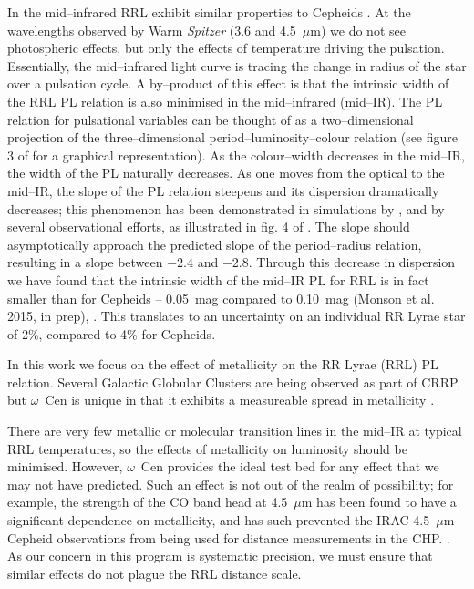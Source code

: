 \documentclass[a4paper,fleqn,usenatbib]{mnras}
\begin{document}
In the mid--infrared RRL exhibit similar properties to Cepheids \citep{2013ApJ...776..135M}. At the wavelengths observed by Warm \textit{Spitzer} (3.6 and 4.5~$\mu$m) we do not see photospheric effects, but only the effects of temperature driving the pulsation. Essentially, the mid--infrared light curve is tracing the change in radius of the star over a pulsation cycle. A by--product of this effect is that the intrinsic width of the RRL PL relation is also minimised in the mid--infrared (mid--IR). The PL relation for pulsational variables can be thought of as a two--dimensional projection of the three--dimensional period--luminosity--colour relation (see figure 3 of \citet{1991PASP..103..933M} for a graphical representation). As the colour--width decreases in the mid--IR, the width of the PL naturally decreases. As one moves from the optical to the mid--IR, the slope of the PL relation steepens and its dispersion dramatically decreases; this phenomenon has been demonstrated in simulations by \citet{2004ApJS..154..633C}, and by several observational efforts, as illustrated in fig. 4 of \citet{2013ApJ...776..135M}. The slope should asymptotically approach the predicted slope of the period--radius relation, resulting in a slope between $-2.4$ and $-2.8$. Through this decrease in dispersion we have found that the intrinsic width of the mid--IR PL for RRL is in fact smaller than for Cepheids -- 0.05~mag compared to 0.10~mag (Monson et al. 2015, in prep), \citep{2015arXiv150507858N}. This translates to an uncertainty on an individual RR Lyrae star of 2\%, compared to 4\% for Cepheids. 

In this work we focus on the effect of metallicity on the RR Lyrae (RRL) PL relation. Several Galactic Globular Clusters are being observed as part of CRRP, but $\omega$~Cen is unique in that it exhibits a measureable spread in metallicity \citep{1975ApJ...201L..71F, 2007ApJ...663..296V, 2014ApJ...791..107V}.

There are very few metallic or molecular transition lines in the mid--IR at typical RRL temperatures, so the effects of metallicity on luminosity should be minimised. However, $\omega$~Cen provides the ideal test bed for any effect that we may not have predicted. Such an effect is not out of the realm of possibility; for example, the strength of the CO band head at 4.5~$\mu$m has been found to have a significant dependence on metallicity, and has such prevented the IRAC 4.5~$\mu$m Cepheid observations from being used for distance measurements in the CHP. \citep{2011ApJ...743...76S, 2012ApJ...759..146M, 2015arXiv150206995S}. As our concern in this program is systematic precision, we must ensure that similar effects do not plague the RRL distance scale.  
\end{document}
